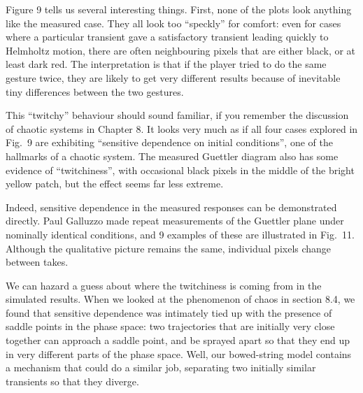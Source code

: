 
  Figure 9 tells us several interesting things. First, none of the plots look 
  anything like the measured case. They all look too “speckly” for comfort: 
  even for cases where a particular transient gave a satisfactory transient 
  leading quickly to Helmholtz motion, there are often neighbouring pixels that 
  are either black, or at least dark red. The interpretation is that if the 
  player tried to do the same gesture twice, they are likely to get very 
  different results because of inevitable tiny differences between the two 
  gestures. 

  This “twitchy” behaviour should sound familiar, if you remember the 
  discussion of chaotic systems in Chapter 8. It looks very much as if all four 
  cases explored in Fig.\ 9 are exhibiting “sensitive dependence on initial 
  conditions”, one of the hallmarks of a chaotic system. The measured Guettler 
  diagram also has some evidence of “twitchiness”, with occasional black pixels 
  in the middle of the bright yellow patch, but the effect seems far less 
  extreme. 

  Indeed, sensitive dependence in the measured responses can be demonstrated 
  directly. Paul Galluzzo made repeat measurements of the Guettler plane under 
  nominally identical conditions, and 9 examples of these are illustrated in 
  Fig.\ 11. Although the qualitative picture remains the same, individual 
  pixels change between takes. 


  We can hazard a guess about where the twitchiness is coming from in the 
  simulated results. When we looked at the phenomenon of chaos in section 8.4, 
  we found that sensitive dependence was intimately tied up with the presence 
  of saddle points in the phase space: two trajectories that are initially very 
  close together can approach a saddle point, and be sprayed apart so that they 
  end up in very different parts of the phase space. Well, our bowed-string 
  model contains a mechanism that could do a similar job, separating two 
  initially similar transients so that they diverge. 

